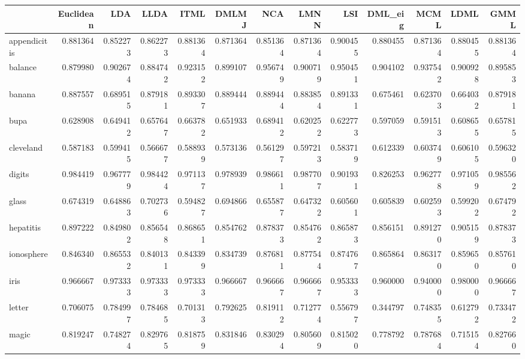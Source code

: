 \begin{tabular}{lrrrrrrrrrrrr}
\toprule
{} &  Euclidean &       LDA &      LLDA &      ITML &     DMLMJ &       NCA &      LMNN &       LSI &   DML\_eig &      MCML &      LDML &      GMML \\
\midrule
appendicitis    &   0.881364 &  0.852273 &  0.862273 &  0.881364 &  0.871364 &  0.851364 &  0.871364 &  0.900455 &  0.880455 &  0.871364 &  0.880455 &  0.881364 \\
balance         &   0.879980 &  0.902674 &  0.884742 &  0.923152 &  0.899107 &  0.956749 &  0.900719 &  0.950451 &  0.904102 &  0.937542 &  0.900928 &  0.895853 \\
banana          &   0.887557 &  0.689515 &  0.879181 &  0.893307 &  0.889444 &  0.889444 &  0.883854 &  0.891331 &  0.675461 &  0.623703 &  0.664032 &  0.879181 \\
bupa            &   0.628908 &  0.649412 &  0.657647 &  0.663782 &  0.651933 &  0.689412 &  0.620252 &  0.622773 &  0.597059 &  0.591513 &  0.608655 &  0.657815 \\
cleveland       &   0.587183 &  0.599415 &  0.566677 &  0.588939 &  0.573136 &  0.561297 &  0.597213 &  0.583719 &  0.612339 &  0.603749 &  0.606105 &  0.596320 \\
digits          &   0.984419 &  0.967779 &  0.984424 &  0.971137 &  0.978939 &  0.986611 &  0.987707 &  0.901931 &  0.826253 &  0.962778 &  0.971059 &  0.985562 \\
glass           &   0.674319 &  0.648863 &  0.702736 &  0.594827 &  0.694866 &  0.655877 &  0.647322 &  0.605601 &  0.605839 &  0.602593 &  0.599202 &  0.674792 \\
hepatitis       &   0.897222 &  0.849802 &  0.856548 &  0.868651 &  0.854762 &  0.878373 &  0.854762 &  0.865873 &  0.856151 &  0.891270 &  0.905159 &  0.878373 \\
ionosphere      &   0.846340 &  0.865532 &  0.840131 &  0.843399 &  0.834739 &  0.876811 &  0.877544 &  0.874767 &  0.865864 &  0.863170 &  0.859650 &  0.857610 \\
iris            &   0.966667 &  0.973333 &  0.973333 &  0.973333 &  0.966667 &  0.966667 &  0.966667 &  0.953333 &  0.960000 &  0.940000 &  0.980000 &  0.966667 \\
letter          &   0.706075 &  0.784997 &  0.784685 &  0.701313 &  0.792625 &  0.819112 &  0.712774 &  0.556797 &  0.344797 &  0.748355 &  0.612792 &  0.733472 \\
magic           &   0.819247 &  0.748274 &  0.829765 &  0.818759 &  0.831846 &  0.830294 &  0.805609 &  0.815020 &  0.778792 &  0.787684 &  0.715154 &  0.827660 \\

\end{tabular}
